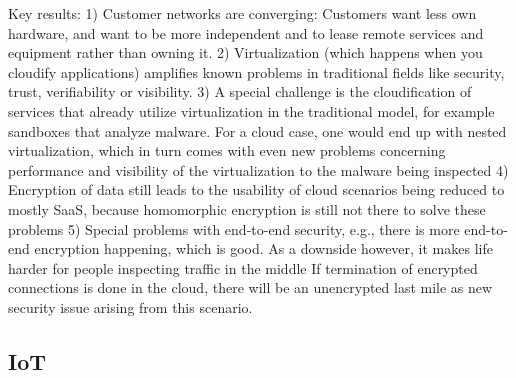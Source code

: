Key results: 1) Customer networks are converging:  Customers want less own hardware, and want to be more independent and to lease remote services and equipment rather than owning it. 
2) Virtualization (which happens when you cloudify applications) amplifies known problems in traditional fields like security, trust, verifiability or visibility.
3) A special challenge is the cloudification of services that already utilize virtualization in the traditional model, for example sandboxes that analyze malware.  For a cloud case, one would end up with nested virtualization, which in turn comes with even new problems concerning performance and visibility of the virtualization to the malware being inspected
4) Encryption of data still leads to the usability of cloud scenarios being reduced to mostly SaaS, because homomorphic encryption is still not there to solve these problems
5) Special problems with end-to-end security, e.g., 
there is more end-to-end encryption happening, which is good.  As a downside however, it makes life harder for people inspecting traffic in the middle
If termination of encrypted connections is done in the cloud, there will be an unencrypted last mile as new security issue arising from this scenario. 

\subsection{IoT}